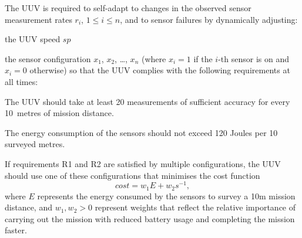 The UUV is required to self-adapt to changes in the observed sensor measurement rates $r_i$, $1\leq i\leq n$, and to sensor failures by dynamically adjusting:
\squishlist
\item[(a)] the UUV speed $sp$
\item[(b)] the sensor configuration $x_1$, $x_2$, \ldots, $x_n$ (where $x_i=1$ if the $i$-th sensor is on and $x_i=0$ otherwise)
\squishend
so that the UUV complies with the following requirements at all times:
\squishlist
	\item[\textbf{R1}:] The UUV should take at least 20 measurements of sufficient accuracy for every 10~metres of mission distance.
	\item[\textbf{R2}:] The energy consumption of the sensors should not exceed 120 Joules per 10 surveyed metres.
	\item[\textbf{R3}:] If requirements R1 and R2 are satisfied by multiple configurations, the UUV should use one of these configurations that minimises the cost function
\begin{equation}
\label{eq:cost}
cost = w_1 E + w_2 s^{-1},
\end{equation}
where $E$ represents the energy consumed by the sensors to survey a 10m mission distance, and $w_1, w_2 >0$ represent weights that reflect the relative importance of carrying out the mission with reduced battery usage and completing the mission faster.
\squishend

